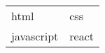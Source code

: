 \documentclass{article}
\begin{document}
  \begin{center}
    \begin{tabular}{ll}
      html & css \\
      javascript & react \\
    \end{tabular}
  \end{center}
\end{document}
